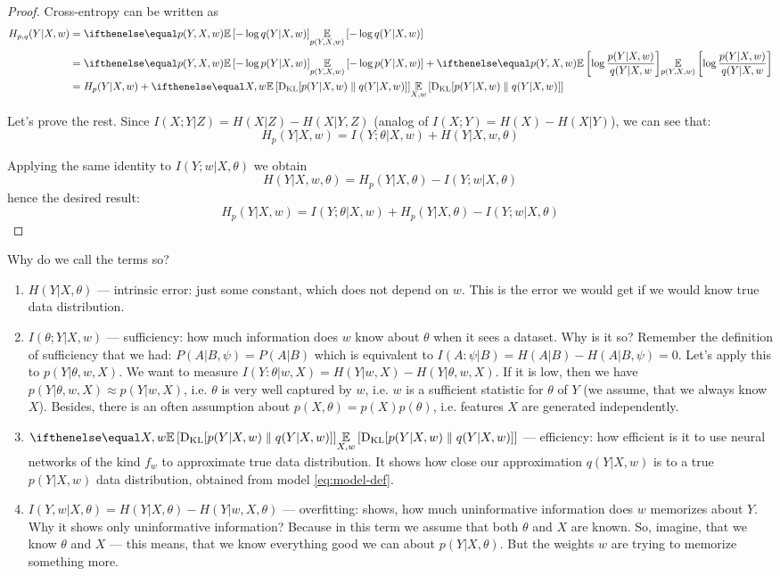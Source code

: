 \documentclass{article}
\begin{document}
\begin{proof}
Cross-entropy can be written as
\begin{equation}
\begin{split}
H_{p,q}(Y|X,w)
&= \expect[p(Y,X,w)]{-\log q(Y|X,w)}
\\
&= \expect[p(Y,X,w)]{-\log p(Y|X,w)} + \expect[p(Y,X,w)]{\log\frac{p(Y|X,w)}{q(Y|X,w}}
\\
&= H_p(Y|X,w) + \expect[X,w]{\kl{p(Y|X,w)}{q(Y|X,w)}}
\end{split}
\end{equation}

Let's prove the rest.
Since $I(X;Y|Z) = H(X|Z) - H(X|Y,Z)$ (analog of $I(X;Y) = H(X) - H(X|Y)$), we can see that:
\[
H_p(Y|X,w) = I(Y;\theta | X,w) + H(Y|X,w,\theta)
\]

Applying the same identity to $I(Y;w|X,\theta)$ we obtain
\[
H(Y|X,w,\theta) = H_p(Y|X,\theta) - I(Y;w|X,\theta)
\]
hence the desired result:
\[
H_p(Y|X,w) = I(Y;\theta | X,w) + H_p(Y|X,\theta) - I(Y;w|X,\theta)
\]
\end{proof}

Why do we call the terms so?
\begin{enumerate}
    \item $H(Y|X,\theta)$ --- intrinsic error: just some constant, which does not depend on $w$. This is the error we would get if we would know true data distribution.
    \item $I(\theta; Y | X,w)$ --- sufficiency: how much information does $w$ know about $\theta$ when it sees a dataset. Why is it so? Remember the definition of sufficiency that we had: $P(A|B,\psi) = P(A|B)$ which is equivalent to $I(A : \psi |B ) = H(A | B) - H(A | B, \psi) = 0$. Let's apply this to $p(Y|\theta, w, X)$. We want to measure $I(Y:\theta | w, X) = H(Y | w, X) - H(Y | \theta, w, X)$. If it is low, then we have $p(Y | \theta, w, X) \approx p(Y | w, X)$, i.e. $\theta$ is very well captured by $w$, i.e. $w$ is a sufficient statistic for $\theta$ of $Y$ (we assume, that we always know $X$). Besides, there is an often assumption about $p(X,\theta) = p(X)p(\theta)$, i.e. features $X$ are generated independently.
    \item $\expect[X,w]{\kl{p(Y|X,w)}{q(Y|X,w)}}$ --- efficiency: how efficient is it to use neural networks of the kind $f_w$ to approximate true data distribution. It shows how close our approximation $q(Y|X,w)$ is to a true $p(Y|X,w)$ data distribution, obtained from model \eqref{eq:model-def}.
    \item $I(Y,w|X,\theta) = H(Y|X,\theta) - H(Y|w,X,\theta)$ --- overfitting: shows, how much uninformative information does $w$ memorizes about $Y$. Why it shows only uninformative information? Because in this term we assume that both $\theta$ and $X$ are known. So, imagine, that we know $\theta$ and $X$ --- this means, that we know everything good we can about $p(Y|X,\theta)$. But the weights $w$ are trying to memorize something more.
\end{enumerate}
\end{document}
